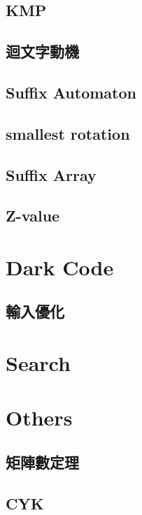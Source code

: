 \subsection{KMP}

\subsection{迴文字動機}

\subsection{Suffix Automaton}

\subsection{smallest rotation}

\subsection{Suffix Array}

\subsection{Z-value}



\section{Dark Code}

\subsection{輸入優化}


\section{Search}


\section{Others}

\subsection{矩陣數定理}

\subsection{CYK}


